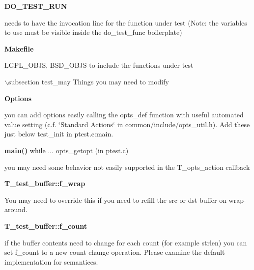 {\bf DO\_\-TEST\_\-RUN}

needs to have the invocation line for the function under test (Note: the variables to use must be visible inside the do\_\-test\_\-func boilerplate)

{\bf Makefile}

LGPL\_\-OBJS, BSD\_\-OBJS to include the functions under test

$\backslash$subsection test\_\-may Things you may need to modify

{\bf Options}

you can add options easily calling the opts\_\-def function with useful automated value setting (c.f. \char`\"{}Standard Actions\char`\"{} in common/include/opts\_\-util.h). Add these just below test\_\-init in ptest.c:main.

{\bf {\bf main()}} while ... opts\_\-getopt (in ptest.c)

you may need some behavior not easily supported in the T\_\-opts\_\-action callback

{\bf {\bf T\_\-test\_\-buffer::f\_\-wrap}}

You may need to override this if you need to refill the src or dst buffer on wrap-around.

{\bf {\bf T\_\-test\_\-buffer::f\_\-count}}

if the buffer contents need to change for each count (for example strlen) you can set f\_\-count to a new count change operation. Please examine the default implementation for semantices. 